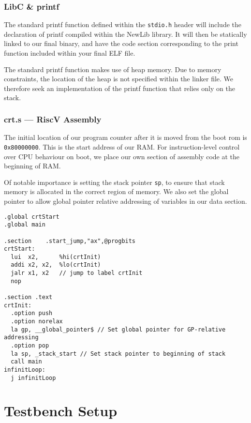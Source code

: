 \documentclass[a4paper,8pt]{report}
\begin{document}
\subsubsection{LibC \& printf}
The standard printf function defined within the \texttt{stdio.h} header will
include the declaration of printf compiled within the NewLib library. It will
then be statically linked to our final binary, and have the code section
corresponding to the print function included within your final ELF file.

The standard printf function makes use of heap memory. Due to memory
constraints, the location of the heap is not specified within the linker file.
We therefore seek an implementation of the printf function that relies only on
the stack. 

\subsubsection{crt.s --- RiscV Assembly}
The initial location of our program counter after it is moved from the boot rom
is \texttt{0x80000000}. This is the start address of our RAM. For
instruction-level control over CPU behaviour on boot, we place our own section
of assembly code at the beginning of RAM.

Of notable importance is setting the stack pointer \texttt{sp}, to ensure that
stack memory is allocated in the correct region of memory. We also set the
global pointer to allow global pointer relative addressing of variables in our
data section.


\lstset{language=[RISC-V]Assembler}
\begin{lstlisting}
.global crtStart
.global main

.section	.start_jump,"ax",@progbits
crtStart:
  lui  x2,      %hi(crtInit)
  addi x2, x2,  %lo(crtInit)
  jalr x1, x2   // jump to label crtInit
  nop

.section .text
crtInit:
  .option push
  .option norelax
  la gp, __global_pointer$ // Set global pointer for GP-relative addressing
  .option pop
  la sp, _stack_start // Set stack pointer to beginning of stack
  call main
infinitLoop:
  j infinitLoop

\end{lstlisting}
\lstset{}

\section{Testbench Setup}
\end{document}
